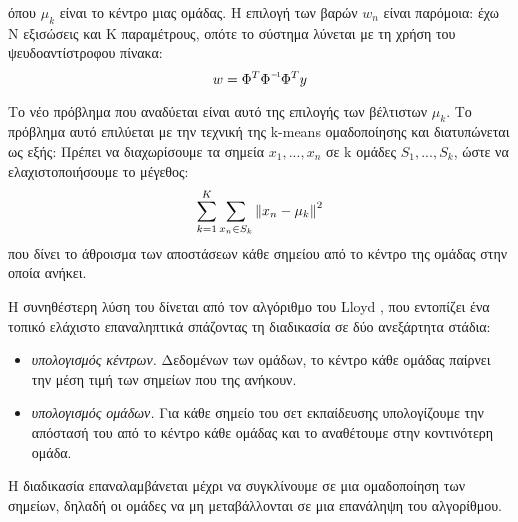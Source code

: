 όπου $\mu_k$ είναι το κέντρο μιας ομάδας. Η επιλογή των βαρών $w_n$ είναι παρόμοια: έχω Ν εξισώσεις και Κ παραμέτρους, οπότε το σύστημα λύνεται με τη χρήση του ψευδοαντίστροφου πίνακα:
\begin{equation}
w= \inv{\Phi^T \Phi} \Phi^T y
\end{equation}
	
	Το νέο πρόβλημα που αναδύεται είναι αυτό της επιλογής των βέλτιστων $\mu_k$. Το πρόβλημα αυτό επιλύεται με την τεχνική της k-means ομαδοποίησης και διατυπώνεται ως εξής: Πρέπει να διαχωρίσουμε τα σημεία $x_1,..., x_n$ σε k ομάδες $S_1,...,S_k$, ώστε να ελαχιστοποιήσουμε το μέγεθος:
	\begin{equation}
\sum_{k=1}^{K} \sum_{x_n \in S_k} \left\lVert x_n - \mu_k\right\rVert^2
\end{equation}
	που δίνει το άθροισμα των αποστάσεων κάθε σημείου από το κέντρο της ομάδας στην οποία ανήκει.
	
	Η συνηθέστερη λύση του δίνεται από τον αλγόριθμο του Lloyd \citep{Lloyd:2006:LSQ:2263356.2269955}, που εντοπίζει ένα τοπικό ελάχιστο επαναληπτικά σπάζοντας τη διαδικασία σε δύο ανεξάρτητα στάδια:
	\begin{itemize}
		\item \textit{υπολογισμός κέντρων.} Δεδομένων των ομάδων, το κέντρο κάθε ομάδας παίρνει την μέση τιμή των σημείων που της ανήκουν.
		\item \textit{υπολογισμός ομάδων.} Για κάθε σημείο του σετ εκπαίδευσης υπολογίζουμε την απόστασή του από το κέντρο κάθε ομάδας και το αναθέτουμε στην κοντινότερη ομάδα.
	\end{itemize}
	
	Η διαδικασία επαναλαμβάνεται μέχρι να συγκλίνουμε σε μια ομαδοποίηση των σημείων, δηλαδή οι ομάδες να μη μεταβάλλονται σε μια επανάληψη του αλγορίθμου.